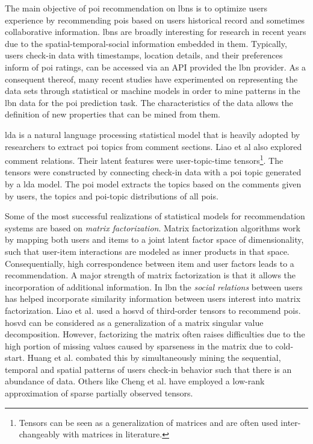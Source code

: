 The main objective of \gls{poi} recommendation on \glspl{lbn} is to optimize users experience by recommending \glspl{poi} based on users historical record and sometimes collaborative information. \Glspl{lbn} are broadly interesting for research in recent years due to the spatial-temporal-social information embedded in them\parencite{Cheng2011ExploringServices}. Typically, users check-in data with timestamps, location details, and their preferences inform of \gls{poi} ratings, can be accessed via an API provided the \gls{lbn} provider. As a consequent thereof, many recent studies have experimented on representing the data sets through statistical or machine models in order to mine patterns in the \gls{lbn} data for the \gls{poi} prediction task. The characteristics of the data allows the definition of new properties that can be mined from them.

\Gls{lda} is a natural language processing statistical model that is heavily adopted by researchers to extract \gls{poi} topics from comment sections\parencite{Liao2018POIFactorization, Huang2020Multi-modalNetworks}. Liao et al also explored comment relations. Their latent features were user-topic-time tensors\footnote{Tensors can be seen as a generalization of matrices and are often used inter-changeably with matrices in literature.}. The tensors were constructed by connecting check-in data with a \gls{poi} topic generated by a \gls{lda} model. The \gls{poi} model extracts the topics based on the comments given by users, the topics and \gls{poi}-topic distributions of all \glspl{poi}. 

Some of the most successful realizations of statistical models for recommendation systems are based on \textit{matrix factorization}\parencite{Cheng2013WhereRecommendation,ChengFusedNetworks, Chen2018PrivacyFactorization, GaoExploringNetworks, LianContent-awareData}. Matrix factorization\parencite{Koren2009MatrixSystems} algorithms work by mapping both users and items to a joint latent factor space of dimensionality, such that user-item interactions are modeled as inner products in that space. Consequentially, high correspondence between item and user factors leads to a recommendation. A major strength of matrix factorization is that it allows the incorporation of additional information. In \gls{lbn} the \textit{social relations} between users has helped incorporate similarity information between users interest into matrix factorization\parencite{Cheng2013WhereRecommendation, Liao2018POIFactorization, Huang2020Multi-modalNetworks}. Liao et al.\parencite{Liao2018POIFactorization} used a \gls{hosvd} of third-order tensors to recommend \glspl{poi}. \Gls{hosvd} can be considered as a generalization of a matrix singular value decomposition\parencite{Vandewalle1990SingularProcessing}. However, factorizing the matrix often raises difficulties due to the high portion of missing values caused by sparseness in the matrix due to cold-start. Huang et al.\parencite{Huang2020Multi-modalNetworks} combated this by simultaneously mining the sequential, temporal and spatial patterns of users check-in behavior such that there is an abundance of data. Others like Cheng et al.\parencite{Cheng2013WhereRecommendation} have employed a low-rank approximation of sparse partially observed tensors.


